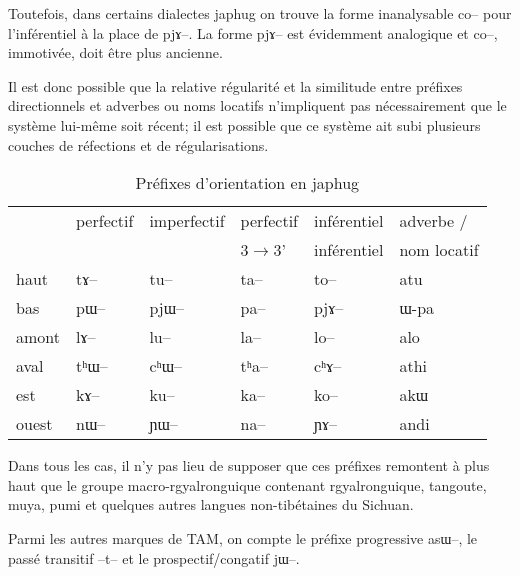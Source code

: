 \documentclass[oldfontcommands,oneside,a4paper,11pt]{article}
\newcommand{\ipa}[1]{{\phon \mbox{#1}}} %
\begin{document}
Toutefois, dans certains dialectes japhug on trouve la forme inanalysable \ipa{co--} pour l'inférentiel à la place de \ipa{pjɤ--}. La forme \ipa{pjɤ--} est évidemment analogique et \ipa{co--}, immotivée, doit être plus ancienne.

Il est donc possible que la relative régularité et la similitude entre préfixes directionnels et adverbes ou noms locatifs n'impliquent pas nécessairement que le système lui-même soit récent; il est possible que ce système ait subi plusieurs couches de réfections et de régularisations. 

\begin{table}[H]
\caption{Préfixes d'orientation en japhug} \label{tab:orientation}
\begin{tabular}{llllll}
\toprule
   &  	perfectif &  	imperfectif  &  	perfectif   &  	inférentiel  & adverbe / \\  	
  &  	  &  	   &  	  3$\rightarrow$3'  &  	inférentiel  & nom locatif\\  	
   \midrule
haut   &  	\ipa{tɤ--}   &  	\ipa{tu--}   &  	\ipa{ta--}   &  	\ipa{to--}  & \ipa{atu} \\  	
bas   &  	\ipa{pɯ--}   &  	\ipa{pjɯ--}   &  	\ipa{pa--}   &  	\ipa{pjɤ--}  &\ipa{ɯ-pa} \\  	
amont   &  	\ipa{lɤ--}   &  	\ipa{lu--}   &  	\ipa{la--}   &  	\ipa{lo--}  & \ipa{alo}  \\  	
aval   &  	\ipa{tʰɯ--}   &  	\ipa{cʰɯ--}   &  	\ipa{tʰa--}   &  	\ipa{cʰɤ--} & \ipa{athi}  \\  	
est   &  	\ipa{kɤ--}   &  	\ipa{ku--}   &  	\ipa{ka--}   &  	\ipa{ko--}  & \ipa{akɯ}  \\  	
ouest   &  	\ipa{nɯ--}   &  	\ipa{ɲɯ--}   &  	\ipa{na--}   &  	\ipa{ɲɤ--}  & \ipa{andi}  \\  	
\bottomrule
\end{tabular} 
\end{table}

Dans tous les cas, il n'y pas lieu de supposer que ces préfixes remontent à plus haut que le groupe macro-rgyalronguique contenant rgyalronguique, tangoute, muya, pumi et quelques autres langues non-tibétaines du Sichuan. 


Parmi les autres marques de TAM, on compte le préfixe progressive \ipa{asɯ--}, le passé transitif \ipa{--t--} et le prospectif/congatif \ipa{jɯ--}. 
\end{document}
